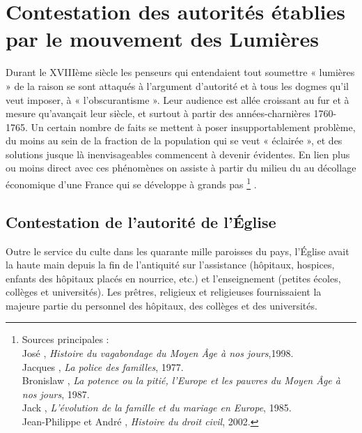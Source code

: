 

\chapter[Contestation des autorités établies par le mouvement des Lumières]{Contestation des autorités établies par le mouvement des Lumières}


 Durant le XVIIIème siècle les penseurs qui entendaient tout soumettre « lumières » de la raison se sont attaqués à l'argument d'autorité et à tous les dogmes qu'il veut imposer, à « l'obscurantisme ». Leur audience est allée croissant au fur et à mesure qu'avançait leur siècle, et surtout à partir des années-charnières 1760-1765. Un certain nombre de faits se mettent à poser insupportablement problème, du moins au sein de la fraction de la population qui se veut « éclairée », et des solutions jusque là inenvisageables commencent à devenir évidentes. En lien plus ou moins direct avec ces phénomènes on assiste à partir du milieu du  au décollage économique d'une France qui se développe à grands pas%
\footnote{Sources principales :
\\José , \emph{Histoire du vagabondage du Moyen Âge à nos jours},1998.
\\Jacques {}, \emph{La police des familles}, 1977.
\\Bronislaw {}, \emph{La potence ou la pitié, l'Europe et les pauvres du Moyen Âge à nos jours}, 1987.
\\Jack {}, \emph{L'évolution de la famille et du mariage en Europe}, 1985.
\\Jean-Philippe  et André , \emph{Histoire du droit civil}, 2002.}%
.

 
\section{Contestation de l'autorité de l'Église}

 Outre le service du culte dans les quarante mille paroisses du pays, l'Église avait la haute main depuis la fin de l'antiquité sur l'assistance (hôpitaux, hospices, enfants des hôpitaux placés en nourrice, etc.) et l'enseignement (petites écoles, collèges et universités). Les prêtres, religieux et religieuses fournissaient la majeure partie du personnel des hôpitaux, des collèges et des universités. 
 
